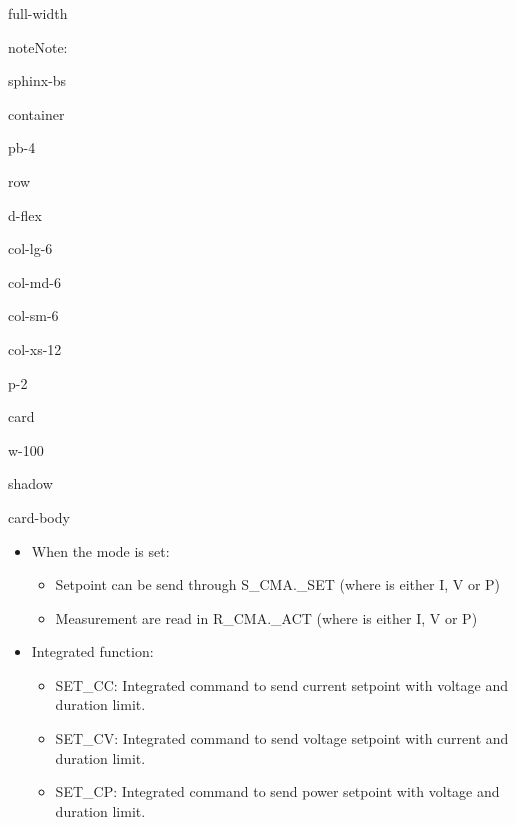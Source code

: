 \documentclass[letterpaper,10pt,english]{jupyterBook}
\begin{document}
\begin{sphinxuseclass}{full-width}
\begin{sphinxadmonition}{note}{Note:}
\begin{sphinxuseclass}{sphinx-bs}
\begin{sphinxuseclass}{container}
\begin{sphinxuseclass}{pb-4}
\begin{sphinxuseclass}{row}
\begin{sphinxuseclass}{d-flex}
\begin{sphinxuseclass}{col-lg-6}
\begin{sphinxuseclass}{col-md-6}
\begin{sphinxuseclass}{col-sm-6}
\begin{sphinxuseclass}{col-xs-12}
\begin{sphinxuseclass}{p-2}
\begin{sphinxuseclass}{card}
\begin{sphinxuseclass}{w-100}
\begin{sphinxuseclass}{shadow}
\begin{sphinxuseclass}{card-body}
\begin{itemize}
\begin{itemize}
\item {} 
\sphinxAtStartPar
{}: Battery is in Current mode

\item {} 
\sphinxAtStartPar
{}: Battery is in Voltage mode

\item {} 
\sphinxAtStartPar
{}: Battery is in Power mode

\item {} 
\sphinxAtStartPar
{}

\end{itemize}

\item {} 
\sphinxAtStartPar
When the mode is set:
\begin{itemize}
\item {} 
\sphinxAtStartPar
Setpoint can be send through S\_CMA.\_SET (where  is either I, V or P)

\item {} 
\sphinxAtStartPar
Measurement are read in R\_CMA.\_ACT (where  is either I, V or P)

\end{itemize}

\item {} 
\sphinxAtStartPar
Integrated function:
\begin{itemize}
\item {} 
\sphinxAtStartPar
SET\_CC: Integrated command to send current setpoint with voltage and duration limit.

\item {} 
\sphinxAtStartPar
SET\_CV: Integrated command to send voltage setpoint with current and duration limit.

\item {} 
\sphinxAtStartPar
SET\_CP: Integrated command to send power setpoint with voltage and duration limit.

\end{itemize}

\end{itemize}


\end{sphinxuseclass}
\end{sphinxuseclass}
\end{sphinxuseclass}
\end{sphinxuseclass}
\end{sphinxuseclass}
\end{sphinxuseclass}
\end{sphinxuseclass}
\end{sphinxuseclass}
\end{sphinxuseclass}
\end{sphinxuseclass}
\end{sphinxuseclass}
\end{sphinxuseclass}
\end{sphinxuseclass}
\end{sphinxuseclass}
\end{sphinxadmonition}
\end{sphinxuseclass}
\end{document}
